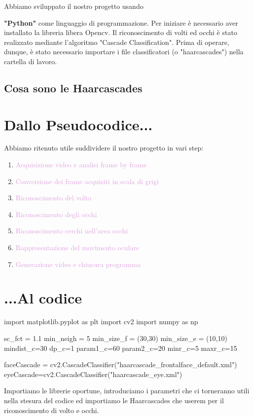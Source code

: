 \documentclass[12pt]{article}
\begin{document}
Abbiamo sviluppato il nostro progetto usando {\textbf{"Python"} come linguaggio di programmazione. Per iniziare \`e necessario aver installato la libreria libera Opencv. Il riconoscimento di volti ed occhi \`e stato realizzato mediante l'algoritmo "Cascade Classification". Prima di operare, dunque, è stato necessario importare i file classificatori (o "haarcascades") nella cartella di lavoro.
	\subsection{Cosa sono le Haarcascades}
\pagebreak

\section{Dallo Pseudocodice...}
Abbiamo ritenuto utile suddividere il nostro progetto in vari step:
\begin{enumerate}
	\item \label{primo}\textcolor{Plum}{Acquisizione video e analisi frame by frame}
	\item \label{secondo} \textcolor{Plum}{Conversione dei frame acquisiti in scala di grigi}
	\item \label{terzo} \textcolor{Plum}{Riconoscimento del volto}
	\item \label{quarto}\textcolor{Plum}{Riconoscimento degli occhi}
    \item \label{quinto}\textcolor{Plum}{Riconoscimento cerchi nell'area occhi}
    \item \label{sesto}\textcolor{Plum}{Rappresentazione del movimento oculare}
    \item \label{settimo}\textcolor{Plum}{Generazione video e chiusura programma}
\end{enumerate}

\pagebreak
\section{...Al codice}
\begin{codice}
import matplotlib.pyplot as plt
import cv2
import numpy as np

sc_fct = 1.1              
min_neigh = 5             
min_size_f = (30,30)      
min_size_e = (10,10)        
mindist_c=30               
dp_c=1                   
param1_c=60               
param2_c=20              
minr_c=5                
maxr_c=15                 


faceCascade = cv2.CascadeClassifier("haarcascade_frontalface_default.xml")
eyeCascade=cv2.CascadeClassifier("haarcascade_eye.xml")
\end{codice}
\vspace{1cm}
Importiamo le librerie oportune, introduciamo i parametri che ci torneranno utili nella stesura del codice ed importiamo le Haarcascades che userem per il riconoscimento di volto e occhi.
\vspace{1.5cm}



}
\end{document}
